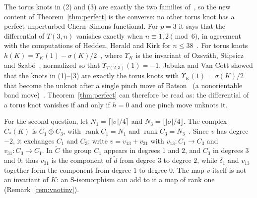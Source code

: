 \documentclass[11pt,reqno]{amsart}
\theoremstyle{plain}
\theoremstyle{definition}
\newcommand{\td}{\widetilde d}
\newcommand{\tC}{\widetilde C}
\begin{document}
The torus knots in (2) and (3) are exactly the two families of~\cite[Prop.~9.37]{DSEquiv}, so the new
content of Theorem~\ref{thm:perfect} is the converse: no other torus knot has a perfect unperturbed
Chern--Simons functional. For $p=3$ it says that the differential of $T(3,n)$ vanishes exactly when
$n\equiv1,2\pmod6$, in agreement with the computations of Hedden, Herald and Kirk for
$n\le38$~\cite[\S12.4]{HHK1}. For torus knots $h(K)=\Upsilon_K(1)-\sigma(K)/2$~\cite[\S1, Prop.~1 and the
paragraph following it]{DScaduto}, where $\Upsilon_K$ is the invariant of Ozsv\'ath, Stipsicz and
Szab\'o~\cite{OSS}, normalized so that $\Upsilon_{T(2,3)}(1)=-1$. Jabuka and Van Cott showed that the knots
in (1)--(3) are exactly the torus knots with $\Upsilon_K(1)=\sigma(K)/2$ that become the unknot after a
single pinch move of Batson~\cite{Batson} (a nonorientable band move)~\cite[Prop.~1.6, Thms.~1.7--1.8]{JVC}.
Theorem~\ref{thm:perfect} can therefore be read as: the differential of a torus knot vanishes if and only
if $h=0$ and one pinch move unknots it.

For the second question, let $N_1=\lceil|\sigma|/4\rceil$ and $N_3=\lfloor|\sigma|/4\rfloor$. The complex
$C_*(K)$ is $C_1\oplus C_3$, with $\operatorname{rank}C_1=N_1$ and $\operatorname{rank}C_3=N_3$~\cite[\S1,
Cor.~3]{DScaduto}. Since $v$ has degree $-2$, it exchanges $C_1$ and $C_3$; write $v=v_{13}+v_{31}$ with
$v_{13}\colon C_1\to C_3$ and $v_{31}\colon C_3\to C_1$. In $\tC$ the group $C_1$ appears in degrees $1$ and
$2$, and $C_3$ in degrees $3$ and $0$; thus $v_{31}$ is the component of $\td$ from degree $3$ to degree
$2$, while $\delta_1$ and $v_{13}$ together form the component from degree $1$ to degree $0$. The map $v$
itself is not an invariant of $K$: an S-isomorphism can add to it a map of rank one
(Remark~\ref{rem:vnotinv}).
\end{document}
